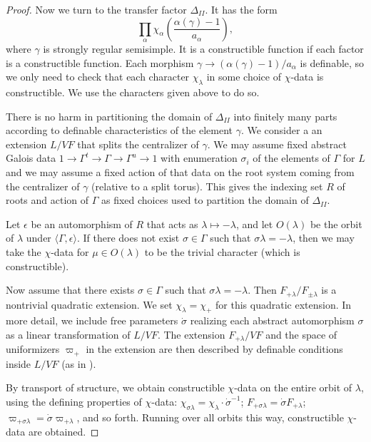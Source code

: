 \begin{proof}
Now we turn to the transfer factor $\Delta_{II}$.  It has the form
\[
\prod_\alpha \chi_\alpha
\left(\frac{\alpha(\gamma)-1}{a_\alpha}\right),
\]
where $\gamma$ is strongly regular semisimple.
It is a constructible function if each factor is a constructible
function. Each morphism $\gamma\to(\alpha(\gamma)-1)/a_\alpha$ is
definable, so we only need to check that each character $\chi_\lambda$
in some choice of $\chi$-data is constructible.  We use the characters
given above to do so.

There is no harm in partitioning the domain of $\Delta_{II}$ into
finitely many parts according to definable characteristics of the
element $\gamma$.  We consider a an extension $L/VF$ that splits the
centralizer of $\gamma$.  We may assume fixed abstract Galois data
$1\to\Gamma^t\to\Gamma\to \Gamma^u\to 1$ with enumeration $\sigma_i$
of the elements of $\Gamma$ for $L$ and we may assume a fixed action
of that data on the root system coming from the centralizer of
$\gamma$ (relative to a split torus).  This gives the indexing set $R$
of roots and action of $\Gamma$ as fixed choices used to partition the
domain of $\Delta_{II}$.

Let $\epsilon$ be an automorphism of $R$ that acts as $\lambda\mapsto
-\lambda$, and let $O(\lambda)$ be the orbit of $\lambda$ under
$\langle\Gamma,\epsilon\rangle$.  If there does not exist
$\sigma\in\Gamma$ such that $\sigma\lambda=-\lambda$, then we may take
the $\chi$-data for $\mu\in O(\lambda)$ to be the trivial character
(which is constructible).

Now assume that there exists $\sigma\in\Gamma$ such that
$\sigma\lambda = -\lambda$.  Then $F_{+\lambda}/F_{\pm \lambda}$ is a
nontrivial quadratic extension.  We set $\chi_\lambda = \chi_+$ for
this quadratic extension.  In more detail, we include free parameters
$\dot\sigma$ realizing each abstract automorphism $\sigma$ as a linear
transformation of $L/VF$.  The extension $F_{+\lambda}/VF$ and the
space of uniformizers $\varpi_+$ in the extension are then described
by definable conditions inside $L/VF$ (as in
\cite{cluckers2011transfer}).

By transport of structure, we obtain constructible $\chi$-data on the
entire orbit of $\lambda$, using the defining properties of
$\chi$-data: $\chi_{\sigma\lambda} = \chi_{\lambda}\cdot
\dot\sigma^{-1}$; $F_{+\sigma\lambda}=\dot\sigma F_{+\lambda}$;
$\varpi_{+\sigma\lambda}=\dot\sigma\varpi_{+\lambda}$, and so forth.
Running over all orbits this way, constructible $\chi$-data are
obtained.
\end{proof}


